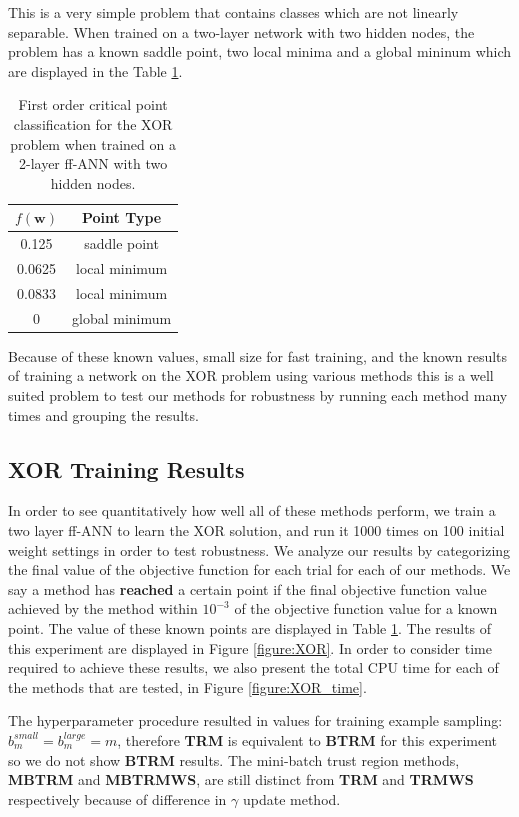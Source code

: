 \documentclass[letterpaper,12pt,titlepage,oneside,final]{book}
\begin{document}
	This is a very simple problem that contains classes which are not linearly separable. When trained on a two-layer network with two hidden nodes, the problem has a known saddle point, two local minima and a global mininum which are displayed in the Table \ref{table:XOR_point_type}.
	
	\begin{table}[h] 
		\centering 
		\begin{tabular}{ |c|c| } 
			\hline 
			$f(\mathbf{w})$ & \textbf{Point Type}\\ 
			\hline
			0.125 & saddle point\\  
			0.0625 & local minimum\\ 
			0.0833 & local minimum\\ 
			0 & global minimum\\ 
			\hline 
		\end{tabular} 
		\caption{First order critical point classification for the XOR problem when trained on a 2-layer ff-ANN with two hidden nodes.} \label{table:XOR_point_type} \end{table}
	
	Because of these known values, small size for fast training, and the known results of training a network on the XOR problem using various methods this is a well suited problem to test our methods for robustness by running each method many times and grouping the results. 
	
	\subsection{XOR Training Results}
	
	In order to see quantitatively how well all of these methods perform, we train a two layer ff-ANN to learn the XOR solution, and run it 1000 times on 100 initial weight settings in order to test robustness. We analyze our results by categorizing the final value of the objective function for each trial for each of our methods. We say a method has \textbf{reached} a certain point if the final objective function value achieved by the method within $10^{-3}$ of the objective function value for a known point. The value of these known points are displayed in Table \ref{table:XOR_point_type}. The results of this experiment are displayed in Figure \ref{figure:XOR}. In order to consider time required to achieve these results, we also present the total CPU time for each of the methods that are tested, in Figure \ref{figure:XOR_time}.
	
	 The hyperparameter procedure resulted in values for training example sampling: $b_{m}^{small} = b_{m}^{large} = m$, therefore \textbf{TRM} is equivalent to \textbf{BTRM} for this experiment so we do not show \textbf{BTRM} results. The mini-batch trust region methods, \textbf{MBTRM} and \textbf{MBTRMWS}, are still distinct from \textbf{TRM} and \textbf{TRMWS} respectively because of difference in $\gamma$ update method.  
	
\end{document}
